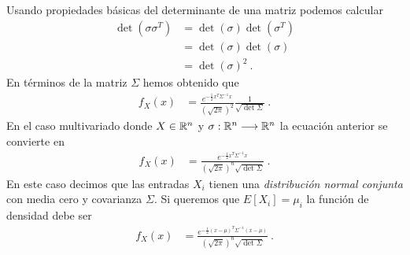 \documentclass[12pt,reqno]{amsart}\usepackage[]{graphicx}\usepackage[]{color}
\begin{document}
Usando propiedades básicas del determinante de una matriz podemos calcular
\begin{equation*}
  \begin{split}
  \det(\sigma \sigma^T) &= \det(\sigma) \det(\sigma^T)\\
  &= \det(\sigma) \det(\sigma)\\
  &= \det(\sigma)^2\:.
  \end{split}
\end{equation*}
En términos de la matriz $\Sigma$ hemos obtenido que
\begin{equation*}
  \begin{split}
  f_{X}(x) &= \frac{e^{-\frac{1}{2}x^T \Sigma ^{-1}x}}{(\sqrt{2\pi})^2}\frac{1}{\sqrt{\det{\Sigma}}}\:.
  \end{split}
\end{equation*}
En el caso multivariado donde $X\in \mathbb{R}^n$ y $\sigma:\mathbb{R}^n\longrightarrow \mathbb{R}^n$ la ecuación anterior se convierte en
\begin{equation}\label{density_N}
  \begin{split}
  f_{X}(x) &= \frac{e^{-\frac{1}{2}x^T \Sigma ^{-1}x}}{(\sqrt{2\pi})^n\sqrt{\det{\Sigma}}}\:.
  \end{split}
\end{equation}
En este caso decimos que las entradas $X_i$ tienen una \emph{distribución normal conjunta} con media cero y covarianza $\Sigma$. Si queremos que $E[X_i]=\mu_i$ la función de densidad debe ser
\begin{equation}\label{density_N_mu}
  \begin{split}
  f_{X}(x) &= \frac{e^{-\frac{1}{2}(x-\mu)^T \Sigma ^{-1}(x-\mu)}}{(\sqrt{2\pi})^n\sqrt{\det{\Sigma}}}\:.
  \end{split}
\end{equation}
\end{document}

